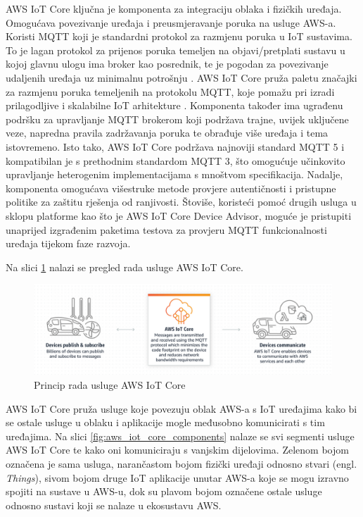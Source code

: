 AWS IoT Core ključna je komponenta za integraciju oblaka i fizičkih uređaja. Omogućava povezivanje uređaja i preusmjeravanje poruka na usluge AWS-a. Koristi MQTT koji je standardni protokol za razmjenu poruka u IoT sustavima. To je lagan  protokol za prijenos poruka temeljen na objavi/pretplati sustavu u kojoj glavnu ulogu ima broker kao posrednik, te je pogodan za povezivanje udaljenih uređaja uz minimalnu potrošnju \cite{what_is_mqtt}. AWS IoT Core pruža paletu značajki za razmjenu poruka temeljenih na protokolu MQTT, koje pomažu pri izradi prilagodljive i skalabilne IoT arhitekture \cite{aws_docs}. Komponenta također ima ugrađenu podršku za upravljanje MQTT brokerom koji podržava trajne, uvijek uključene veze, napredna pravila zadržavanja poruka te obrađuje više uređaja i tema istovremeno. Isto tako, AWS IoT Core podržava najnoviji standard MQTT 5 i kompatibilan je s prethodnim standardom MQTT 3, što omogućuje učinkovito upravljanje heterogenim implementacijama s mnoštvom specifikacija. Nadalje, komponenta omogućava višestruke metode provjere autentičnosti i pristupne politike za zaštitu rješenja od ranjivosti. Štoviše, koristeći pomoć drugih usluga u sklopu platforme kao što je AWS IoT Core Device Advisor, moguće je pristupiti unaprijed izgrađenim paketima testova za provjeru MQTT funkcionalnosti uređaja tijekom faze razvoja.

Na slici \ref{fig:aws_iot_core_overview} nalazi se pregled rada usluge AWS IoT Core.

\begin{figure}[ht]
	\centering
	\includegraphics[scale=0.6]{imgs/aws_iot_core_overview}
	\caption{Princip rada usluge AWS IoT Core \cite{aws_docs}}
	\label{fig:aws_iot_core_overview}
\end{figure}

AWS IoT Core pruža usluge koje povezuju oblak AWS-a s IoT uređajima kako bi se ostale usluge u oblaku i aplikacije mogle međusobno komunicirati s tim uređajima. Na slici \ref{fig:aws_iot_core_components} nalaze se svi segmenti usluge AWS IoT Core te kako oni komuniciraju s vanjskim dijelovima. Zelenom bojom označena je sama usluga, narančastom bojom fizički uređaji odnosno stvari (engl. \textit{Things}), sivom bojom druge IoT aplikacije unutar AWS-a koje se mogu izravno spojiti na sustave u AWS-u, dok su plavom bojom označene ostale usluge odnosno sustavi koji se nalaze u ekosustavu AWS.

